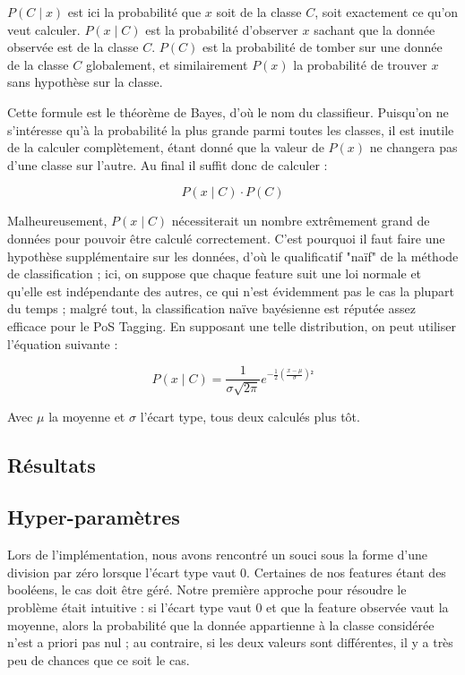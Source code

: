 \documentclass[french, 14pt]{memoir}
\begin{document}
$P(C \mid x)$ est ici la probabilité que $x$ soit de la classe $C$, soit exactement ce qu'on veut calculer. $P(x \mid C)$ est la probabilité d'observer $x$ sachant que la donnée observée est de la classe $C$. $P(C)$ est la probabilité de tomber sur une donnée de la classe $C$ globalement, et similairement $P(x)$ la probabilité de trouver $x$ sans hypothèse sur la classe.

Cette formule est le théorème de Bayes, d'où le nom du classifieur. Puisqu'on ne s'intéresse qu'à la probabilité la plus grande parmi toutes les classes, il est inutile de la calculer complètement, étant donné que la valeur de $P(x)$ ne changera pas d'une classe sur l'autre. Au final il suffit donc de calculer :

\begin{equation}
P(x \mid C) \cdot P(C)
\end{equation}

Malheureusement, $P(x \mid C)$ nécessiterait un nombre extrêmement grand de données pour pouvoir être calculé correctement. C'est pourquoi il faut faire une hypothèse supplémentaire sur les données, d'où le qualificatif "naïf" de la méthode de classification ; ici, on suppose que chaque feature suit une loi normale et qu'elle est indépendante des autres, ce qui n'est évidemment pas le cas la plupart du temps ; malgré tout, la classification naïve bayésienne est réputée assez efficace pour le PoS Tagging. En supposant une telle distribution, on peut utiliser l'équation suivante :

\begin{equation}
P(x \mid C) = \frac{1}{\sigma \sqrt{2 \pi}} e^{-\frac {1} {2} (\frac {x - \mu} {\sigma})²}
\end{equation}

Avec $\mu$ la moyenne et $\sigma$ l'écart type, tous deux calculés plus tôt.


\subsection{Résultats}


\subsection{Hyper-paramètres}
Lors de l'implémentation, nous avons rencontré un souci sous la forme d'une division par zéro lorsque l'écart type vaut 0. Certaines de nos features étant des booléens, le cas doit être géré. Notre première approche pour résoudre le problème était intuitive : si l'écart type vaut 0 et que la feature observée vaut la moyenne, alors la probabilité que la donnée appartienne à la classe considérée n'est a priori pas nul ; au contraire, si les deux valeurs sont différentes, il y a très peu de chances que ce soit le cas.
\end{document}
